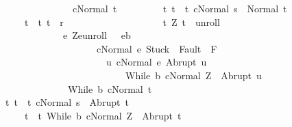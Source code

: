 \begin{isabellebody}
\ \ \ \ \ \ \ \ \ \ \ \ \ \ \ \ \ \ \ \ \ \ \ {\isasymGamma}{\isasymturnstile}c{\isasymdown}Normal\ t{\isacharbraceright}\ {\isasymand}\isanewline
\ \ \ \ \ \ \ \ {\isacharparenleft}{\isasymforall}t{\isachardot}\ t\ {\isasymin}\ {\isacharbraceleft}t{\isachardot}\ {\isasymGamma}{\isasymturnstile}{\isasymlangle}c{\isacharcomma}Normal\ s{\isasymrangle}\ {\isasymRightarrow}\ Normal\ t{\isacharbraceright}\ {\isasymlongrightarrow}\isanewline
\ \ \ \ \ \ \ \ \ \ \ \ \ t\ {\isasymin}\ {\isacharbraceleft}t{\isachardot}\ {\isacharparenleft}t{\isacharcomma}{\isasymsigma}{\isacharparenright}\ {\isasymin}\ {\isacharquery}r{\isacharbraceright}\ {\isasyminter}\ \ \isanewline
\ \ \ \ \ \ \ \ \ \ \ \ \ \ \ \ \ {\isacharbraceleft}t{\isachardot}\ {\isacharparenleft}Z{\isacharcomma}\ t{\isacharparenright}\ {\isasymin}\ {\isacharquery}unroll\ {\isasymand}\ \isanewline
\ \ \ \ \ \ \ \ \ \ \ \ \ \ \ \ \ \ \ \ \ {\isacharparenleft}{\isasymforall}e{\isachardot}\ {\isacharparenleft}Z{\isacharcomma}e{\isacharparenright}{\isasymin}{\isacharquery}unroll\ {\isasymlongrightarrow}\ \ e{\isasymin}b\ \isanewline
\ \ \ \ \ \ \ \ \ \ \ \ \ \ \ \ \ \ \ \ \ \ \ \ \ \ \ {\isasymlongrightarrow}\ {\isasymGamma}{\isasymturnstile}{\isasymlangle}c{\isacharcomma}Normal\ e{\isasymrangle}\ {\isasymRightarrow}{\isasymnotin}{\isacharparenleft}{\isacharbraceleft}Stuck{\isacharbraceright}\ {\isasymunion}\ Fault\ {\isacharbackquote}\ {\isacharparenleft}{\isacharminus}F{\isacharparenright}{\isacharparenright}\ {\isasymand}\ \isanewline
\ \ \ \ \ \ \ \ \ \ \ \ \ \ \ \ \ \ \ \ \ \ \ \ \ \ \ \ \ \ {\isacharparenleft}{\isasymforall}u{\isachardot}\ {\isasymGamma}{\isasymturnstile}{\isasymlangle}c{\isacharcomma}Normal\ e{\isasymrangle}\ {\isasymRightarrow}Abrupt\ u\ {\isasymlongrightarrow}\ \isanewline
\ \ \ \ \ \ \ \ \ \ \ \ \ \ \ \ \ \ \ \ \ \ \ \ \ \ \ \ \ \ \ \ \ \ {\isasymGamma}{\isasymturnstile}{\isasymlangle}While\ b\ c{\isacharcomma}Normal\ Z{\isasymrangle}\ {\isasymRightarrow}\ Abrupt\ u{\isacharparenright}{\isacharparenright}\ {\isasymand}\ \isanewline
\ \ \ \ \ \ \ \ \ \ \ \ \ \ \ \ \ \ \ \ \ \ {\isasymGamma}{\isasymturnstile}{\isacharparenleft}While\ b\ c{\isacharparenright}{\isasymdown}Normal\ t{\isacharbraceright}{\isacharparenright}\ \ {\isasymand}\ \isanewline
\ \ \ \ \ \ \ \ \ {\isacharparenleft}{\isasymforall}t{\isachardot}\ t\ {\isasymin}\ {\isacharbraceleft}t{\isachardot}\ {\isasymGamma}{\isasymturnstile}{\isasymlangle}c{\isacharcomma}Normal\ s{\isasymrangle}\ {\isasymRightarrow}\ Abrupt\ t{\isacharbraceright}\ {\isasymlongrightarrow}\isanewline
\ \ \ \ \ \ \ \ \ \ \ \ \ t\ {\isasymin}\ {\isacharbraceleft}t{\isachardot}\ {\isasymGamma}{\isasymturnstile}{\isasymlangle}While\ b\ c{\isacharcomma}Normal\ Z{\isasymrangle}\ {\isasymRightarrow}\ Abrupt\ t{\isacharbraceright}{\isacharparenright}{\isachardoublequoteclose}\isanewline

\end{isabellebody}
